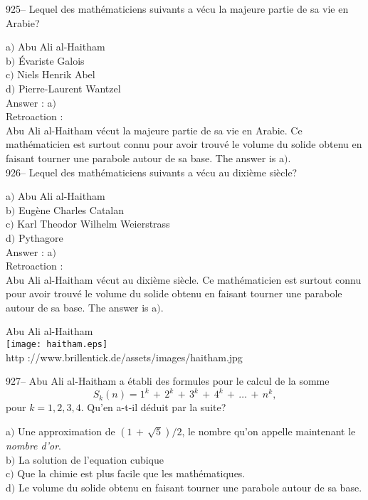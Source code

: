 ﻿\documentclass[letterpaper, 12pt]{article}
\begin{document}
925-- Lequel des math\'ematiciens suivants a v\'ecu la majeure
partie de sa vie en Arabie?

a$)$ Abu Ali al-Haitham \\
b$)$ \'Evariste Galois \\
c$)$ Niels Henrik Abel \\
d$)$ Pierre-Laurent Wantzel \\

Answer : a$)$\\

Retroaction : \\
Abu Ali al-Haitham v\'ecut la majeure partie de sa vie en Arabie. Ce
math\'ematicien est surtout connu pour avoir trouv\'e le volume du
solide obtenu en faisant tourner une parabole
autour de sa base. The answer is a$)$.\\

926-- Lequel des math\'ematiciens suivants a v\'ecu au dixi\`eme
si\`ecle?

a$)$ Abu Ali al-Haitham \\
b$)$ Eug\`ene Charles Catalan \\
c$)$ Karl Theodor Wilhelm Weierstrass \\
d$)$ Pythagore\\

Answer : a$)$\\

Retroaction : \\
Abu Ali al-Haitham v\'ecut au dixi\`eme si\`ecle. Ce math\'ematicien
est surtout connu pour avoir trouv\'e le volume du solide obtenu en
faisant tourner une parabole
autour de sa base. The answer is a$)$.\\

        \begin{center}
        Abu Ali al-Haitham\\
    \texttt{[image: haitham.eps]}\\
        {\footnotesize http ://www.brillentick.de/assets/images/haitham.jpg}
    \end{center}

927-- Abu Ali al-Haitham a \'etabli des formules pour le calcul de la somme
$$S_k(n) =1^k\,+\,2^k\,+\,3^k\,+\,4^k\,+\,\ldots\,+\,n^k,$$
pour $k=1,2,3,4$. Qu'en a-t-il d\'eduit par la suite?

a$)$ Une approximation de $(1\,+\,\sqrt5)/2$, le nombre qu'on appelle
maintenant le {\sl nombre d'or}. \\
b$)$ La solution de l'equation cubique \\
c$)$ Que la chimie est plus facile que les math\'ematiques. \\
d$)$ Le volume du solide obtenu en faisant tourner une parabole autour de sa
base.\\
\end{document}
